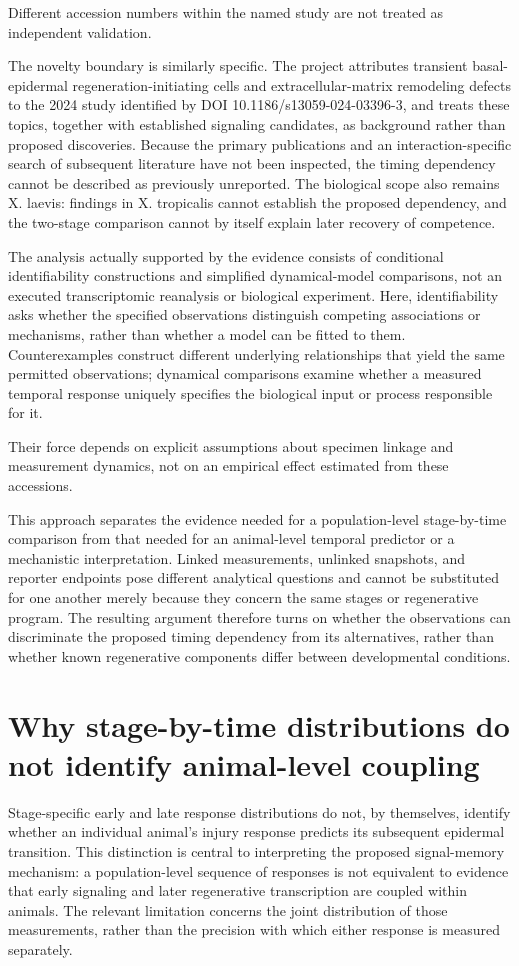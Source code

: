 \documentclass[11pt]{article}
\begin{document}
Different accession numbers within the named study are not treated as independent validation.

The novelty boundary is similarly specific. The project attributes transient basal-epidermal regeneration-initiating cells and extracellular-matrix remodeling defects to the 2024 study identified by DOI 10.1186/s13059-024-03396-3, and treats these topics, together with established signaling candidates, as background rather than proposed discoveries. Because the primary publications and an interaction-specific search of subsequent literature have not been inspected, the timing dependency cannot be described as previously unreported. The biological scope also remains X. laevis: findings in X. tropicalis cannot establish the proposed dependency, and the two-stage comparison cannot by itself explain later recovery of competence.

The analysis actually supported by the evidence consists of conditional identifiability constructions and simplified dynamical-model comparisons, not an executed transcriptomic reanalysis or biological experiment. Here, identifiability asks whether the specified observations distinguish competing associations or mechanisms, rather than whether a model can be fitted to them. Counterexamples construct different underlying relationships that yield the same permitted observations; dynamical comparisons examine whether a measured temporal response uniquely specifies the biological input or process responsible for it.

Their force depends on explicit assumptions about specimen linkage and measurement dynamics, not on an empirical effect estimated from these accessions.

This approach separates the evidence needed for a population-level stage-by-time comparison from that needed for an animal-level temporal predictor or a mechanistic interpretation. Linked measurements, unlinked snapshots, and reporter endpoints pose different analytical questions and cannot be substituted for one another merely because they concern the same stages or regenerative program. The resulting argument therefore turns on whether the observations can discriminate the proposed timing dependency from its alternatives, rather than whether known regenerative components differ between developmental conditions.

\section{Why stage-by-time distributions do not identify animal-level coupling}
Stage-specific early and late response distributions do not, by themselves, identify whether an individual animal\textquoteright{}s injury response predicts its subsequent epidermal transition. This distinction is central to interpreting the proposed signal-memory mechanism: a population-level sequence of responses is not equivalent to evidence that early signaling and later regenerative transcription are coupled within animals. The relevant limitation concerns the joint distribution of those measurements, rather than the precision with which either response is measured separately.
\end{document}
